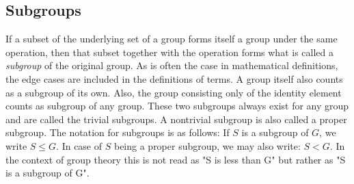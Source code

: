 









\subsection{Subgroups}
If a subset of the underlying set of a group forms itself a group under the same operation, then that subset together with the operation forms what is called a \emph{subgroup} of the original group. As is often the case in mathematical definitions, the edge cases are included in the definitions of terms. A group itself also counts as a subgroup of its own. Also, the group consisting only of the identity element counts as subgroup of any group. These two subgroups always exist for any group and are called the trivial subgroups. A nontrivial subgroup is also called a proper subgroup. The notation for subgroups is as follows: If $S$ is a subgroup of $G$, we write $S \leq G$. In case of $S$ being a proper subgroup, we may also write: $S < G$. In the context of group theory this is not read as "S is less than G" but rather as "S is a subgroup of G".


